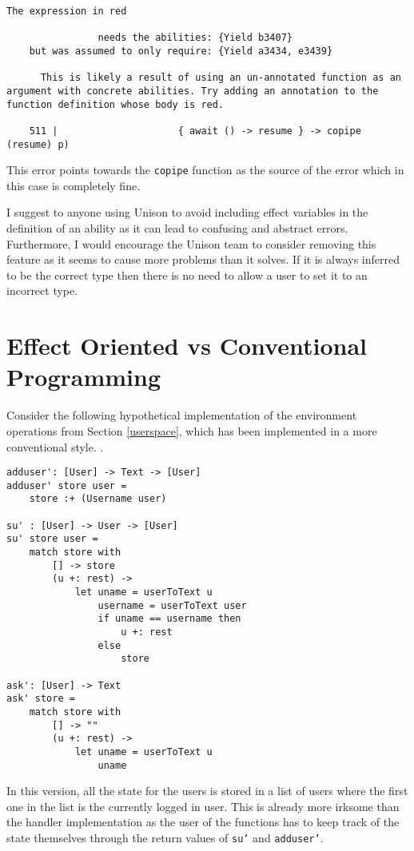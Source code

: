 \documentclass[logo,bsc,singlespacing,parskip]{infthesis}
\begin{document}
\begin{lstlisting}[style=terminal]
  The expression in red
  
                needs the abilities: {Yield b3407}
    but was assumed to only require: {Yield a3434, e3439}

      This is likely a result of using an un-annotated function as an argument with concrete abilities. Try adding an annotation to the function definition whose body is red.
  
    511 |                     { await () -> resume } -> copipe (resume) p)
\end{lstlisting}

This error points towards the \texttt{copipe} function as the source of the
error which in this case is completely fine.

I suggest to anyone using Unison to avoid including effect variables in the
definition of an ability as it can lead to confusing and abstract errors.
Furthermore, I would encourage the Unison team to consider removing this
feature as it seems to cause more problems than it solves. If it is always
inferred to be the correct type then there is no need to allow a user to set it
to an incorrect type.


\section{Effect Oriented vs Conventional Programming}
\label{effop}

Consider the following hypothetical implementation of the environment operations from Section \ref{userspace}, which has been implemented in a more conventional style.
.

\begin{lstlisting}[language=unison]
adduser': [User] -> Text -> [User]
adduser' store user =
    store :+ (Username user)

su' : [User] -> User -> [User]
su' store user =
    match store with
        [] -> store
        (u +: rest) ->
            let uname = userToText u
                username = userToText user
                if uname == username then
                    u +: rest
                else
                    store

ask': [User] -> Text
ask' store =
    match store with
        [] -> ""
        (u +: rest) ->
            let uname = userToText u
                uname
\end{lstlisting}

In this version, all the state for the users is stored in a list of users where
the first one in the list is the currently logged in user. This is already more
irksome than the handler implementation as the user of the functions has to keep
track of the state themselves through the return values of \texttt{su'} and
\texttt{adduser'}.
\end{document}
